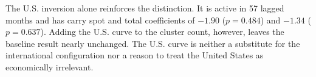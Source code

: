 
The U.S. inversion alone reinforces the distinction. It is active in 57 lagged months and has carry spot and total coefficients of $-1.90$ ($p=0.484$) and $-1.34$ ($p=0.637$). Adding the U.S. curve to the cluster count, however, leaves the baseline result nearly unchanged. The U.S. curve is neither a substitute for the international configuration nor a reason to treat the United States as economically irrelevant.
